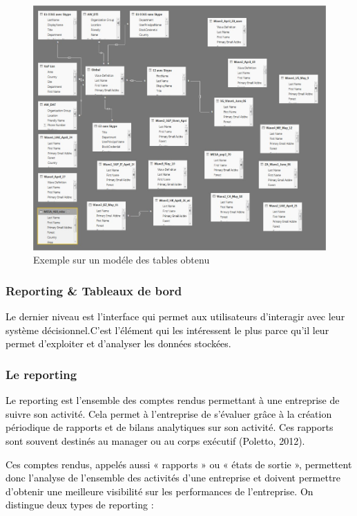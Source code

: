 \begin{figure}[H]
	\begin{center}
		\includegraphics[width=0.8\linewidth]{Projet_O365/modele}
\end{center}
	\caption{Exemple sur un modéle des tables obtenu}
	\label{fig:18}	
\end{figure}


\subsubsection{Reporting \& Tableaux de bord }

\textcolor{black}{Le dernier niveau est l’interface qui permet aux utilisateurs d’interagir avec leur système décisionnel.C’est l’élément qui les intéressent le plus parce qu’il leur permet d’exploiter et d’analyser les données
stockées.}

\subsubsection*{Le reporting }

\textcolor{black}{Le reporting est l’ensemble des comptes rendus permettant à une entreprise de suivre son activité.
Cela permet à l’entreprise de s’évaluer grâce à la création périodique de rapports et de bilans analytiques
sur son activité. Ces rapports sont souvent destinés au manager ou au corps exécutif (Poletto, 2012).}

\textcolor{black}{ Ces comptes rendus, appelés aussi « rapports » ou « états de sortie », permettent donc l’analyse de l’ensemble des activités d’une entreprise et doivent permettre d’obtenir une meilleure visibilité sur les performances de l’entreprise. On distingue deux types de reporting :}


